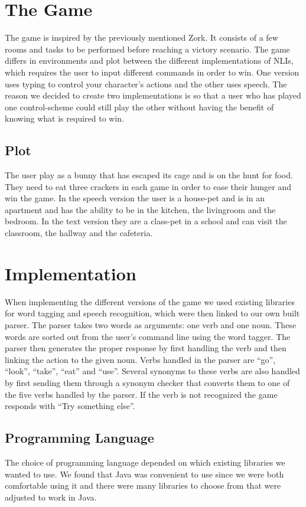 \section{The Game}
The game is inspired by the previously mentioned Zork. It consists of a few rooms and tasks to be performed before reaching a victory scenario. The game differs in environments and plot between the different implementations of NLIs, which requires the user to input different commands in order to win. One version uses typing to control your character’s actions and the other uses speech. The reason we decided to create two implementations is so that a user who has played one control-scheme could still play the other without having the benefit of knowing what is required to win.

\subsection{Plot}
The user play as a bunny that has escaped its cage and is on the hunt for food. They need to eat three crackers in each game in order to ease their hunger and win the game. In the speech version the user is a house-pet and is in an apartment and has the ability to be in the kitchen, the livingroom and the bedroom. In the text version they are a class-pet in a school and can visit the classroom, the hallway and the cafeteria.

\section{Implementation}
When implementing the different versions of the game we used existing libraries for word tagging and speech recognition, which were then linked to our own built parser. The parser takes two words as arguments: one verb and one noun. These words are sorted out from the user's command line using the word tagger. The parser then generates the proper response by first handling the verb and then linking the action to the given noun. Verbs handled in the parser are ``go'', ``look'', ``take'', ``eat'' and ``use''. Several synonyms to these verbs are also handled by first sending them through a synonym checker that converts them to one of the five verbs handled by the parser. If the verb is not recognized the game responds with ``Try something else''.

\subsection{Programming Language}
The choice of programming language depended on which existing libraries we wanted to use. We found that Java was convenient to use since we were both comfortable using it and there were many libraries to choose from that were adjusted to work in Java.

